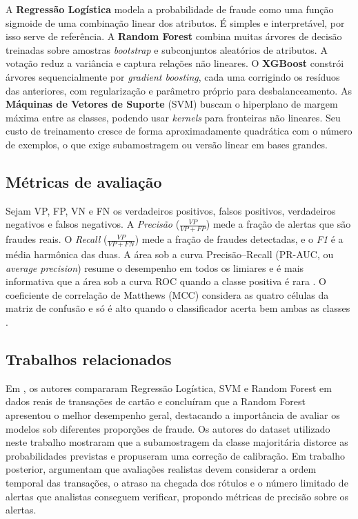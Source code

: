 \documentclass[12pt]{article}
\begin{document}
A \textbf{Regressão Logística} modela a probabilidade de fraude como uma função
sigmoide de uma combinação linear dos atributos. É simples e interpretável,
por isso serve de referência. A \textbf{Random Forest} \cite{breiman:2001}
combina muitas árvores de decisão treinadas sobre amostras \emph{bootstrap} e
subconjuntos aleatórios de atributos. A votação reduz a variância e captura
relações não lineares. O \textbf{XGBoost} \cite{chen:2016} constrói árvores
sequencialmente por \emph{gradient boosting}, cada uma corrigindo os resíduos
das anteriores, com regularização e parâmetro próprio para desbalanceamento. As
\textbf{Máquinas de Vetores de Suporte} (SVM) \cite{cortes:1995} buscam o
hiperplano de margem máxima entre as classes, podendo usar \emph{kernels} para
fronteiras não lineares. Seu custo de treinamento cresce de forma
aproximadamente quadrática com o número de exemplos, o que exige subamostragem
ou versão linear em bases grandes.

\subsection{Métricas de avaliação}

Sejam VP, FP, VN e FN os verdadeiros positivos, falsos positivos, verdadeiros
negativos e falsos negativos. A \emph{Precisão} ($\frac{VP}{VP+FP}$) mede a
fração de alertas que são fraudes reais. O \emph{Recall}
($\frac{VP}{VP+FN}$) mede a fração de fraudes detectadas, e o \emph{F1} é a
média harmônica das duas. A área sob a curva Precisão--Recall (PR-AUC, ou
\emph{average precision}) resume o desempenho em todos os limiares e é mais
informativa que a área sob a curva ROC quando a classe positiva é rara
\cite{saito:2015}. O coeficiente de correlação de Matthews (MCC) considera as
quatro células da matriz de confusão e só é alto quando o classificador acerta
bem ambas as classes \cite{chicco:2020}.

\subsection{Trabalhos relacionados}

Em \cite{bhattacharyya:2011}, os autores compararam Regressão
Logística, SVM e Random Forest em dados reais de transações de cartão e
concluíram que a Random Forest apresentou o melhor desempenho geral, destacando
a importância de avaliar os modelos sob diferentes proporções de fraude.
Os autores do dataset utilizado neste trabalho
\cite{dalpozzolo:2015} mostraram que a subamostragem da classe majoritária
distorce as probabilidades previstas e propuseram uma correção de calibração.
Em trabalho posterior, \cite{dalpozzolo:2018}
argumentam que avaliações realistas devem considerar a ordem temporal das
transações, o atraso na chegada dos rótulos e o número limitado de alertas que
analistas conseguem verificar, propondo métricas de precisão sobre os alertas.
\end{document}
